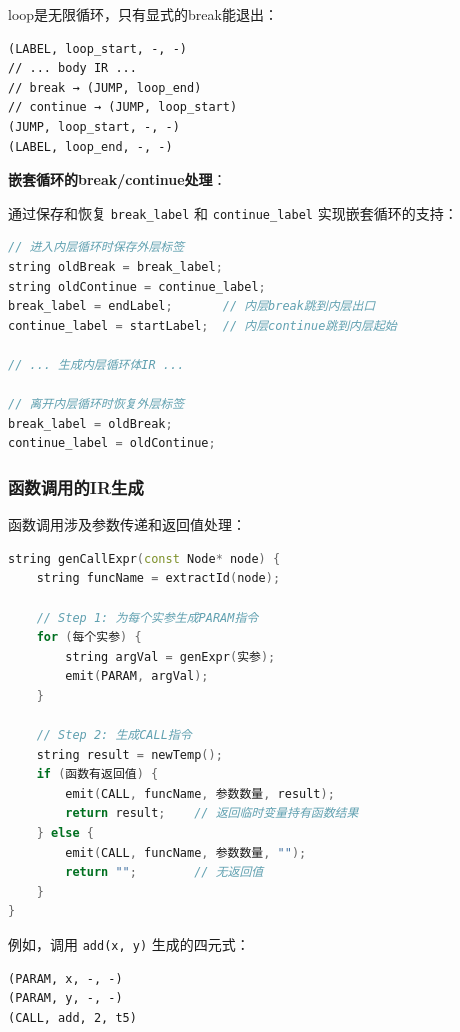 \documentclass[12pt,a4paper]{ctexart}
\begin{document}
loop是无限循环，只有显式的break能退出：

\begin{lstlisting}[language=IR, caption={loop语句的四元式翻译模式}]
(LABEL, loop_start, -, -)
// ... body IR ...
// break → (JUMP, loop_end)
// continue → (JUMP, loop_start)
(JUMP, loop_start, -, -)
(LABEL, loop_end, -, -)
\end{lstlisting}

\textbf{嵌套循环的break/continue处理}：

通过保存和恢复 \texttt{break\_label} 和 \texttt{continue\_label} 实现嵌套循环的支持：

\begin{lstlisting}[language=C++, caption={嵌套循环的break/continue标签管理}]
// 进入内层循环时保存外层标签
string oldBreak = break_label;
string oldContinue = continue_label;
break_label = endLabel;       // 内层break跳到内层出口
continue_label = startLabel;  // 内层continue跳到内层起始

// ... 生成内层循环体IR ...

// 离开内层循环时恢复外层标签
break_label = oldBreak;
continue_label = oldContinue;
\end{lstlisting}

\subsubsection{函数调用的IR生成}

函数调用涉及参数传递和返回值处理：

\begin{lstlisting}[language=C++, caption={函数调用IR生成}]
string genCallExpr(const Node* node) {
    string funcName = extractId(node);

    // Step 1: 为每个实参生成PARAM指令
    for (每个实参) {
        string argVal = genExpr(实参);
        emit(PARAM, argVal);
    }

    // Step 2: 生成CALL指令
    string result = newTemp();
    if (函数有返回值) {
        emit(CALL, funcName, 参数数量, result);
        return result;    // 返回临时变量持有函数结果
    } else {
        emit(CALL, funcName, 参数数量, "");
        return "";        // 无返回值
    }
}
\end{lstlisting}

例如，调用 \texttt{add(x, y)} 生成的四元式：
\begin{lstlisting}[language=IR]
(PARAM, x, -, -)
(PARAM, y, -, -)
(CALL, add, 2, t5)
\end{lstlisting}
\end{document}
